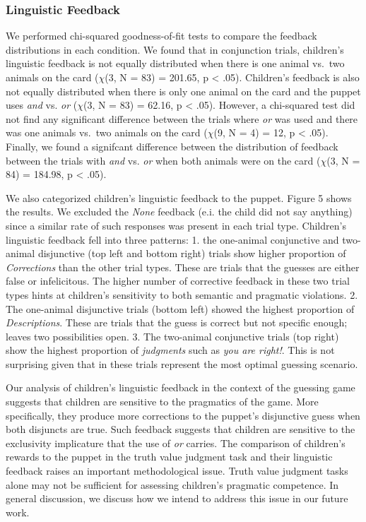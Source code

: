 \documentclass[10pt, letterpaper]{article}
\begin{document}
\subsubsection{Linguistic Feedback}\label{linguistic-feedback}

We performed chi-squared goodness-of-fit tests to compare the feedback
distributions in each condition. We found that in conjunction trials,
children's linguistic feedback is not equally distributed when there is
one animal vs.~two animals on the card (\(\chi\)(3, N = 83) = 201.65, p
\textless{} .05). Children's feedback is also not equally distributed
when there is only one animal on the card and the puppet uses \emph{and}
vs. \emph{or} (\(\chi\)(3, N = 83) = 62.16, p \textless{} .05). However,
a chi-squared test did not find any significant difference between the
trials where \emph{or} was used and there was one animals vs.~two
animals on the card (\(\chi\)(9, N = 4) = 12, p \textless{} .05).
Finally, we found a signifcant difference between the distribution of
feedback between the trials with \emph{and} vs. \emph{or} when both
animals were on the card (\(\chi\)(3, N = 84) = 184.98, p \textless{}
.05).

We also categorized children's linguistic feedback to the puppet. Figure
5 shows the results. We excluded the \emph{None} feedback (e.i. the
child did not say anything) since a similar rate of such responses was
present in each trial type. Children's linguistic feedback fell into
three patterns: 1. the one-animal conjunctive and two-animal disjunctive
(top left and bottom right) trials show higher proportion of
\emph{Corrections} than the other trial types. These are trials that the
guesses are either false or infelicitous. The higher number of
corrective feedback in these two trial types hints at children's
sensitivity to both semantic and pragmatic violations. 2. The one-animal
disjunctive trials (bottom left) showed the highest proportion of
\emph{Descriptions}. These are trials that the guess is correct but not
specific enough; leaves two possibilities open. 3. The two-animal
conjunctive trials (top right) show the highest proportion of
\emph{judgments} such as \emph{you are right!}. This is not surprising
given that in these trials represent the most optimal guessing scenario.

Our analysis of children's linguistic feedback in the context of the
guessing game suggests that children are sensitive to the pragmatics of
the game. More specifically, they produce more corrections to the
puppet's disjunctive guess when both disjuncts are true. Such feedback
suggests that children are sensitive to the exclusivity implicature that
the use of \emph{or} carries. The comparison of children's rewards to
the puppet in the truth value judgment task and their linguistic
feedback raises an important methodological issue. Truth value judgment
tasks alone may not be sufficient for assessing children's pragmatic
competence. In general discussion, we discuss how we intend to address
this issue in our future work.
\end{document}
